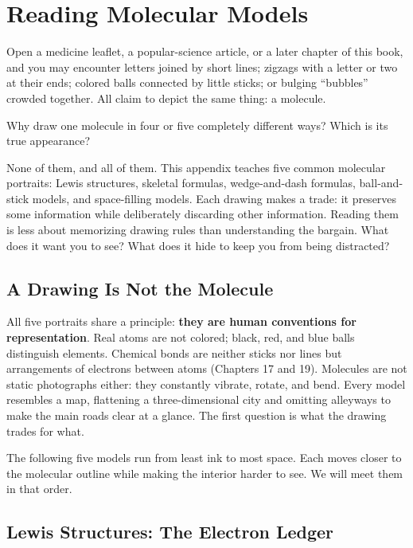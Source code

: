 \chapter{Reading Molecular Models}

\begin{kaichang}
Open a medicine leaflet, a popular-science article, or a later chapter of this book, and you may encounter letters joined by short lines; zigzags with a letter or two at their ends; colored balls connected by little sticks; or bulging ``bubbles'' crowded together. All claim to depict the same thing: a molecule.

Why draw one molecule in four or five completely different ways? Which is its true appearance?

None of them, and all of them. This appendix teaches five common molecular portraits: Lewis structures, skeletal formulas, wedge-and-dash formulas, ball-and-stick models, and space-filling models. Each drawing makes a trade: it preserves some information while deliberately discarding other information. Reading them is less about memorizing drawing rules than understanding the bargain. What does it want you to see? What does it hide to keep you from being distracted?
\end{kaichang}

\section{A Drawing Is Not the Molecule}

All five portraits share a principle: \textbf{they are human conventions for representation}. Real atoms are not colored; black, red, and blue balls distinguish elements. Chemical bonds are neither sticks nor lines but arrangements of electrons between atoms (Chapters 17 and 19). Molecules are not static photographs either: they constantly vibrate, rotate, and bend. Every model resembles a map, flattening a three-dimensional city and omitting alleyways to make the main roads clear at a glance. The first question is what the drawing trades for what.

The following five models run from least ink to most space. Each moves closer to the molecular outline while making the interior harder to see. We will meet them in that order.

\section{Lewis Structures: The Electron Ledger}

